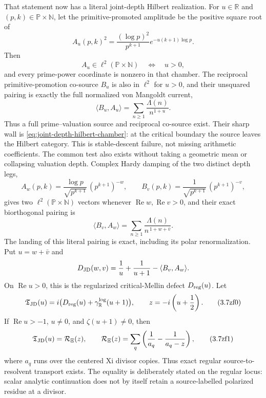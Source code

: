 \documentclass[11pt]{article}
\theoremstyle{definition}
\theoremstyle{remark}
\newcommand{\R}{\mathbb R}
\newcommand{\N}{\mathbb N}
\newcommand{\Rea}{\operatorname{Re}}
\begin{document}
That statement now has a literal joint-depth Hilbert realization.  For
\(u\in\R\) and \((p,k)\in\mathbb P\times\N\), let the
primitive-promoted amplitude be the positive square root of
\[
 A_u(p,k)^2=
   \frac{(\log p)^2}{p^{k+1}}
      e^{-u(k+1)\log p}.
\tag{3.7zc}\label{eq:joint-depth-primitive-source}
\]
Then
\[
        A_u\in\ell^2(\mathbb P\times\N)
        \quad\Longleftrightarrow\quad u>0,
\tag{3.7zd}\label{eq:joint-depth-hilbert-chamber}
\]
and every prime-power coordinate is nonzero in that chamber.  The reciprocal
primitive-promotion co-source \(B_u\) is also in \(\ell^2\) for \(u>0\), and
their unsquared pairing is exactly the full normalized von Mangoldt current,
\[
          \langle B_u,A_u\rangle
             =\sum_{n\ge1}\frac{\Lambda(n)}{n^{1+u}}.
\tag{3.7ze}\label{eq:joint-depth-prime-current}
\]
Thus a full prime--valuation source and reciprocal co-source exist.  Their
sharp wall is
\eqref{eq:joint-depth-hilbert-chamber}: at the critical boundary the source
leaves the Hilbert category.  This is stable-descent failure, not missing
arithmetic coefficients.
The common test also exists without taking a geometric mean or collapsing
valuation depth.  Complex Hardy damping of the two distinct depth legs,
\[
 A_w(p,k)=\frac{\log p}{\sqrt{p^{k+1}}}\,(p^{k+1})^{-w},
 \qquad
 B_v(p,k)=\frac1{\sqrt{p^{k+1}}}\,(p^{k+1})^{-v},
\]
gives two \(\ell^2(\mathbb P\times\mathbb N)\) vectors whenever
\(\Rea w,\Rea v>0\), and their exact biorthogonal pairing is
\[
 \langle B_v,A_w\rangle
 =\sum_{n\ge1}\frac{\Lambda(n)}
        {n^{\,1+w+\bar v}}.
\tag{3.7zf}\label{eq:joint-depth-biorthogonal-common-test}
\]
The landing of this literal pairing is exact, including its polar
renormalization.  Put \(u=w+\bar v\) and
\[
 D_{\rm JD}(w,v)
   =\frac1u+\frac1{u+1}-\langle B_v,A_w\rangle .
\]
On \(\Rea u>0\), this is the regularized critical-Mellin defect
\(D_{\rm reg}(u)\).  Let
\[
 \mathfrak T_{\rm JD}(u)
   =i\bigl(D_{\rm reg}(u)+\gamma_{\mathbb R}^{\log}(u+1)\bigr),
 \qquad z=-i\left(u+\frac12\right).
\tag{3.7zf0}\label{eq:joint-depth-pole-filled-trace}
\]
If \(\Rea u>-1\), \(u\ne0\), and \(\zeta(u+1)\ne0\), then
\[
 \mathfrak T_{\rm JD}(u)=\mathcal R_\Xi(z),\qquad
 \mathcal R_\Xi(z)=\sum_q
 \left(\frac1{a_q}-\frac1{a_q-z}\right),
\tag{3.7zf1}\label{eq:joint-depth-xi-relative-resolvent-landing}
\]
where \(a_q\) runs over the centered Xi divisor copies.  Thus exact regular
source-to-resolvent transport exists.  The equality is deliberately stated
on the regular locus: scalar analytic continuation does not by itself retain
a source-labelled polarized residue at a divisor.
\end{document}
